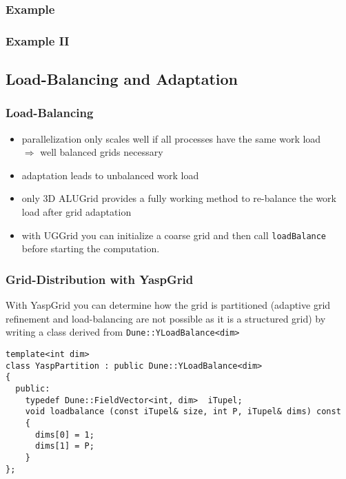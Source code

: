 \begin{frame} \frametitle{Example}
  
\end{frame}

\begin{frame} \frametitle{Example II}
  
\end{frame}

\subsection{Load-Balancing and Adaptation}
\begin{frame}[fragile]
  \frametitle<presentation>{Load-Balancing}
  \begin{itemize}
  \item parallelization only scales well if all processes have the
    same work load\\
    $\Rightarrow$ well balanced grids necessary
  \item adaptation leads to unbalanced work load
  \item only 3D ALUGrid provides a fully working method to re-balance the work load after grid adaptation
   \item with UGGrid you can initialize a coarse grid and then call \lstinline!loadBalance! before starting the
         computation.
  \end{itemize}
\end{frame}

\begin{frame}[fragile]
  \frametitle{Grid-Distribution with YaspGrid}
With YaspGrid you can determine how the grid is partitioned (adaptive grid refinement and load-balancing are not possible as it is a structured grid) by writing a class derived from
\lstinline!Dune::YLoadBalance<dim>!

\begin{lstlisting}
template<int dim>
class YaspPartition : public Dune::YLoadBalance<dim>
{
  public:
    typedef Dune::FieldVector<int, dim>  iTupel;
    void loadbalance (const iTupel& size, int P, iTupel& dims) const
    {
      dims[0] = 1;
      dims[1] = P;
    }
};
\end{lstlisting}
\end{frame}

